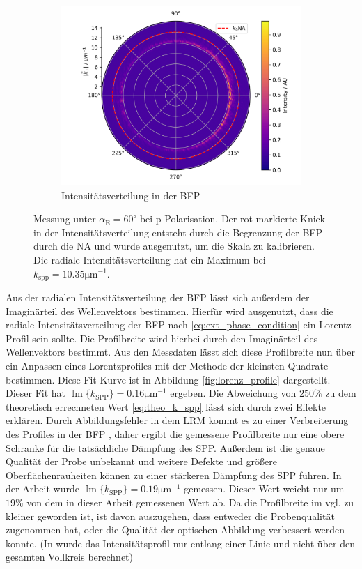 \documentclass[titlepage]{article}
\renewcommand{\Im}{\operatorname{\mathbb{I}m}}
\begin{document}
\begin{figure}
\begin{subfigure}[b]{0.7\textwidth}
			\centering
			\includegraphics[width=\textwidth]{figures/example_polar.png}
			\caption{Intensitätsverteilung in der BFP}
			\label{fig:example_bfp}		
		\end{subfigure}
		\caption{ Messung unter $\alpha_{\mathrm{E}} = 60^\circ$ bei p-Polarisation.
			Der rot markierte Knick in der Intensitätsverteilung entsteht durch die Begrenzung der BFP durch die NA und wurde ausgenutzt, um die Skala zu kalibrieren. Die radiale Intensitätsverteilung hat ein Maximum bei $k_{\mathrm{spp}}= 10.35 \mathrm{\mu m ^{-1}}$.}			
	\end{figure}
	Aus der radialen Intensitätsverteilung der BFP lässt sich außerdem der Imaginärteil des Wellenvektors bestimmen. Hierfür  wird ausgenutzt, dass die radiale Intensitätsverteilung der BFP nach \eqref{eq:ext_phase_condition} ein Lorentz-Profil sein sollte. Die Profilbreite wird hierbei durch den Imaginärteil des Wellenvektors bestimmt. Aus den Messdaten lässt sich diese Profilbreite nun über ein Anpassen eines Lorentzprofiles mit der Methode der kleinsten Quadrate bestimmen. Diese Fit-Kurve ist in Abbildung \ref{fig:lorenz_profile} dargestellt. Dieser Fit hat $\Im\{k_\mathrm{SPP}\} = 0.16 \mathrm{\mu m}^{-1}$ ergeben. Die Abweichung von $250\%$ zu dem theoretisch errechneten Wert \ref{eq:theo_k_spp} lässt sich durch zwei Effekte erklären. Durch Abbildungsfehler in dem LRM kommt es zu einer Verbreiterung des Profiles in der BFP \cite{Jaruschewski.2020}, daher ergibt die gemessene Profilbreite nur eine obere Schranke für die tatsächliche Dämpfung des SPP. Außerdem ist die genaue Qualität der Probe unbekannt und weitere Defekte und größere Oberflächenrauheiten können zu einer stärkeren Dämpfung des SPP führen. In der Arbeit \cite{Jaruschewski.2020} wurde  $\Im\{k_\mathrm{SPP}\} = 0.19 \mathrm{\mu m}^{-1}$ gemessen. Dieser Wert weicht nur um $19\%$ von dem in dieser Arbeit gemessenen Wert ab. Da die Profilbreite im vgl. zu \cite{Jaruschewski.2020} kleiner geworden ist, ist davon auszugehen, dass entweder die Probenqualität zugenommen hat, oder die Qualität der optischen Abbildung verbessert werden konnte. (In \cite{Jaruschewski.2020} wurde das Intensitätsprofil nur entlang einer Linie und nicht über den gesamten Vollkreis berechnet)
	
\end{document}
